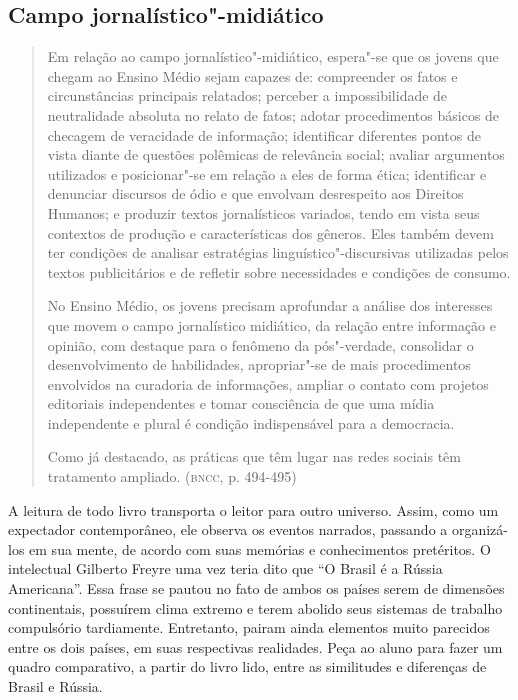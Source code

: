 \documentclass[12pt]{extarticle}
\begin{document}
\subsection{Campo jornalístico"-midiático}

\begin{quote}
Em relação ao campo jornalístico"-midiático, espera"-se que os jovens
que chegam ao Ensino Médio sejam capazes de: compreender os fatos e
circunstâncias principais relatados; perceber a impossibilidade de
neutralidade absoluta no relato de fatos; adotar procedimentos básicos
de checagem de veracidade de informação; identificar diferentes pontos
de vista diante de questões polêmicas de relevância social; avaliar
argumentos utilizados e posicionar"-se em relação a eles de forma ética;
identificar e denunciar discursos de ódio e que envolvam desrespeito aos
Direitos Humanos; e produzir textos jornalísticos variados, tendo em
vista seus contextos de produção e características dos gêneros. Eles
também devem ter condições de analisar estratégias
linguístico"-discursivas utilizadas pelos textos publicitários e de
refletir sobre necessidades e condições de consumo.

No Ensino Médio, os jovens precisam aprofundar a análise dos interesses
que movem o campo jornalístico midiático, da relação entre informação e
opinião, com destaque para o fenômeno da pós"-verdade, consolidar o
desenvolvimento de habilidades, apropriar"-se de mais procedimentos
envolvidos na curadoria de informações, ampliar o contato com projetos
editoriais independentes e tomar consciência de que uma mídia
independente e plural é condição indispensável para a democracia.

Como já destacado, as práticas que têm lugar nas redes sociais têm
tratamento ampliado. (\textsc{bncc}, p. 494-495)
\end{quote}

A leitura de todo livro transporta o leitor para outro universo.
Assim, como um expectador contemporâneo, ele observa os eventos
narrados, passando a organizá-los em sua mente, de acordo com suas
memórias e conhecimentos pretéritos. O intelectual Gilberto Freyre uma
vez teria dito que ``O Brasil é a Rússia Americana''. Essa frase se
pautou no fato de ambos os países serem de dimensões continentais,
possuírem clima extremo e terem abolido seus sistemas de trabalho
compulsório tardiamente. Entretanto, pairam ainda elementos muito
parecidos entre os dois países, em suas respectivas realidades. Peça
ao aluno para fazer um quadro comparativo, a partir do livro lido,
entre as similitudes e diferenças de Brasil e Rússia.
\end{document}
